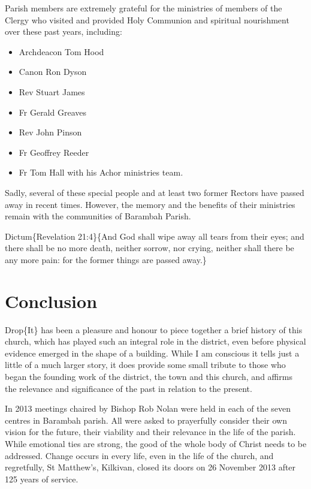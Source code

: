Parish members are extremely grateful for the ministries of members of the Clergy who visited and provided Holy Communion and spiritual nourishment over these past years, including:

\begin{itemize}
\item
  Archdeacon Tom Hood
\item
  Canon Ron Dyson
\item
  Rev Stuart James
\item
  Fr Gerald Greaves
\item
  Rev John Pinson
\item
  Fr Geoffrey Reeder
\item
  Fr Tom Hall with his Achor ministries team\emph{.}
\end{itemize}

Sadly, several of these special people and at least two former Rectors have passed away in recent times. However, the memory and the benefits of their ministries remain with the communities of Barambah Parish.

Dictum\{Revelation 21:4\}\{And God shall wipe away all tears from their eyes; and there shall be no more death, neither sorrow, nor crying, neither shall there be any more pain: for the former things are passed away.\}

\hypertarget{conclusion}{%
\chapter{Conclusion}\label{conclusion}}

Drop\{It\} has been a pleasure and honour to piece together a brief history of this church, which has played such an integral role in the district, even before physical evidence emerged in the shape of a building. While I am conscious it tells just a little of a much larger story, it does provide some small tribute to those who began the founding work of the district, the town and this church, and affirms the relevance and significance of the past in relation to the present.

In 2013 meetings chaired by Bishop Rob Nolan were held in each of the seven centres in Barambah parish. All were asked to prayerfully consider their own vision for the future, their viability and their relevance in the life of the parish. While emotional ties are strong, the good of the whole body of Christ needs to be addressed. Change occurs in every life, even in the life of the church, and regretfully, St Matthew's, Kilkivan, closed its doors on 26 November 2013 after 125 years of service.

